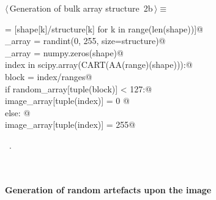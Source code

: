 \documentclass[11pt,oneside]{article}	%
\begin{document}
%
%
%
	
\begin{flushleft} \small
\begin{minipage}{\linewidth} \label{scrap2}
\protect{}$\langle\,$Generation of bulk array structure\nobreak\ {\footnotesize 2b}$\,\rangle\equiv$
\vspace{-1ex}
\begin{list}{}{} \item
\mbox{}\verb@ranges = [shape[k]/structure[k] for k in range(len(shape))]@\\
\mbox{}\verb@random_array = randint(0, 255, size=structure)@\\
\mbox{}\verb@image_array = numpy.zeros(shape)@\\
\mbox{}\verb@for index in scipy.array(CART(AA(range)(shape))):@\\
\mbox{}\verb@   block = index/ranges@\\
\mbox{}\verb@   if random_array[tuple(block)] < 127:@\\
\mbox{}\verb@      image_array[tuple(index)] = 0 @\\
\mbox{}\verb@   else: @\\
\mbox{}\verb@      image_array[tuple(index)] = 255@\\
\mbox{}\verb@@{\NWsep}
\end{list}
\vspace{-1ex}
\footnotesize\addtolength{\baselineskip}{-1ex}
\begin{list}{}{\setlength{\itemsep}{-\parsep}\setlength{\itemindent}{-\leftmargin}}
\item \NWtxtMacroRefIn\ .
\end{list}
\end{minipage}\\[4ex]
\end{flushleft}



\paragraph{Generation of random artefacts upon the image}
\end{document}
